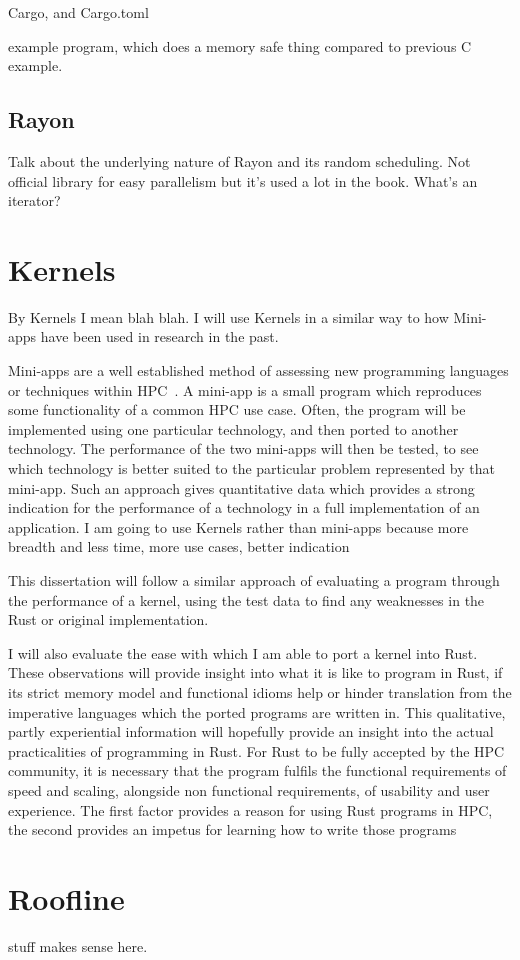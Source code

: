 Cargo, and Cargo.toml
 
example program, which does a memory safe thing compared to previous C example.
\subsection{Rayon}
Talk about the underlying nature of Rayon and its random scheduling. Not official library for easy parallelism but it's used a lot in the book.
What's an iterator?
\section{Kernels}
By Kernels I mean blah blah. I will use Kernels in a similar way to how Mini-apps have been used in research in the past.

Mini-apps are a well established method of assessing new programming languages or techniques within HPC~\cite{Mallinson:2014, Slaughter:2015, martineau2017arch}. A mini-app is a small program which reproduces some functionality of a common HPC use case. Often, the program will be implemented using one particular technology, and then ported to another technology. The performance of the two mini-apps will then be tested, to see which technology is better suited to the particular problem represented by that mini-app. Such an approach gives quantitative data which provides a strong indication for the performance of a technology in a full implementation of an application. I am going to use Kernels rather than mini-apps because more breadth and less time, more use cases, better indication

This dissertation will follow a similar approach of evaluating a program through the performance of a kernel, using the test data to find any weaknesses in the Rust or original implementation.

I will also evaluate the ease with which I am able to port a kernel into Rust. These observations will provide insight into what it is like to program in Rust, if its strict memory model and functional idioms help or hinder translation from the imperative languages which the ported programs are written in. This qualitative, partly experiential information will hopefully provide an insight into the actual practicalities of programming in Rust. For Rust to be fully accepted by the HPC community, it is necessary that the program fulfils the functional requirements of speed and scaling, alongside non functional requirements, of usability and user experience. The first factor provides a reason for using Rust programs in HPC, the second provides an impetus for learning how to write those programs


\section{Roofline} stuff makes sense here.
